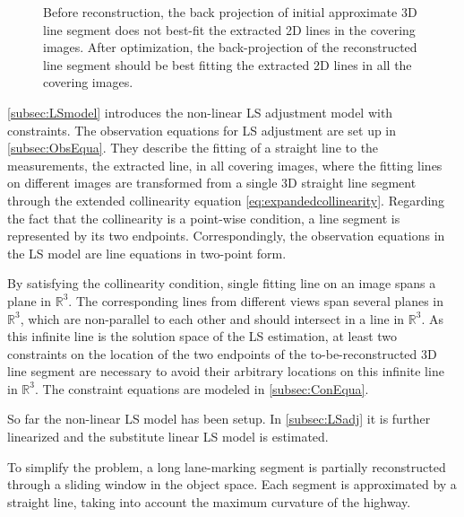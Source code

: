 \begin{figure}
	\centering
	
	\caption{\small Before reconstruction, the back projection of initial approximate 3D line segment does not best-fit the extracted 2D lines in the covering images. After optimization, the back-projection of the reconstructed line segment should be best fitting the extracted 2D lines in all the covering images.}
	\label{fig:mainidea}
\end{figure}


\cref{subsec:LSmodel} introduces the non-linear LS adjustment model with constraints. The observation equations for LS adjustment are set up in \cref{subsec:ObsEqua}. They describe the fitting of a straight line to the measurements, the extracted line, in all covering images, where the fitting lines on different images are transformed from a single 3D straight line segment through the extended collinearity equation \eqref{eq:expandedcollinearity}. Regarding the fact that the collinearity is a point-wise condition, a line segment is represented by its two endpoints. Correspondingly, the observation equations in the LS model are line equations in two-point form. 

By satisfying the collinearity condition, single fitting line on an image spans a plane in $\mathbb{R}^3$. The corresponding lines from different views span several planes in $\mathbb{R}^3$, which are non-parallel to each other and should intersect in a line in $\mathbb{R}^3$. As this infinite line is the solution space of the LS estimation, at least two constraints on the location of the two endpoints of the to-be-reconstructed 3D line segment are necessary to avoid their arbitrary locations on this infinite line in $\mathbb{R}^3$. The constraint equations are modeled in \cref{subsec:ConEqua}.

So far the non-linear LS model has been setup. In \cref{subsec:LSadj} it is further linearized and the substitute linear LS model is estimated.


To simplify the problem, a long lane-marking segment is partially reconstructed through a sliding window in the object space. Each segment is approximated by a straight line, taking into account the maximum curvature of the highway. 


